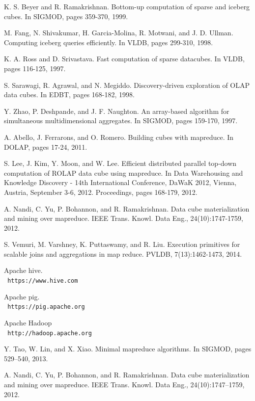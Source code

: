 \documentclass[10pt,journal,compsoc]{IEEEtran}
\begin{document}
\begin{thebibliography}{3}

  K. S. Beyer and R. Ramakrishnan. Bottom-up
computation of sparse and iceberg cubes. In SIGMOD,
pages 359-370, 1999.

M. Fang, N. Shivakumar, H. Garcia-Molina,
R. Motwani, and J. D. Ullman. Computing iceberg
queries efficiently. In VLDB, pages 299-310, 1998.

K. A. Ross and D. Srivastava. Fast computation of
sparse datacubes. In VLDB, pages 116-125, 1997.

S. Sarawagi, R. Agrawal, and N. Megiddo.
Discovery-driven exploration of OLAP data cubes. In
EDBT, pages 168-182, 1998.

Y. Zhao, P. Deshpande, and J. F. Naughton. An
array-based algorithm for simultaneous
multidimensional aggregates. In SIGMOD, pages
159-170, 1997.




A. Abello, J. Ferrarons, and O. Romero. Building
cubes with mapreduce. In DOLAP, pages 17-24, 2011.

S. Lee, J. Kim, Y. Moon, and W. Lee. Efficient
distributed parallel top-down computation of ROLAP
data cube using mapreduce. In Data Warehousing and
Knowledge Discovery - 14th International Conference,
DaWaK 2012, Vienna, Austria, September 3-6, 2012.
Proceedings, pages 168-179, 2012.

A. Nandi, C. Yu, P. Bohannon, and R. Ramakrishnan.
Data cube materialization and mining over
mapreduce. IEEE Trans. Knowl. Data Eng.,
24(10):1747-1759, 2012.

S. Vemuri, M. Varshney, K. Puttaswamy, and R. Liu.
Execution primitives for scalable joins and
aggregations in map reduce. PVLDB,
7(13):1462-1473, 2014.


Apache hive.
\\\texttt{ https://www.hive.com}

Apache pig. 
\\\texttt{ https://pig.apache.org}

Apache Hadoop
\\\texttt{ http://hadoop.apache.org}

Y. Tao, W. Lin, and X. Xiao. Minimal mapreduce algorithms. In SIGMOD, pages 529–540, 2013.
\\\texttt{}

A. Nandi, C. Yu, P. Bohannon, and R. Ramakrishnan. Data cube materialization and mining over mapreduce. IEEE Trans. Knowl. Data Eng., 24(10):1747–1759, 2012. 
\\\texttt{}
\end{thebibliography}
 
\end{document}
